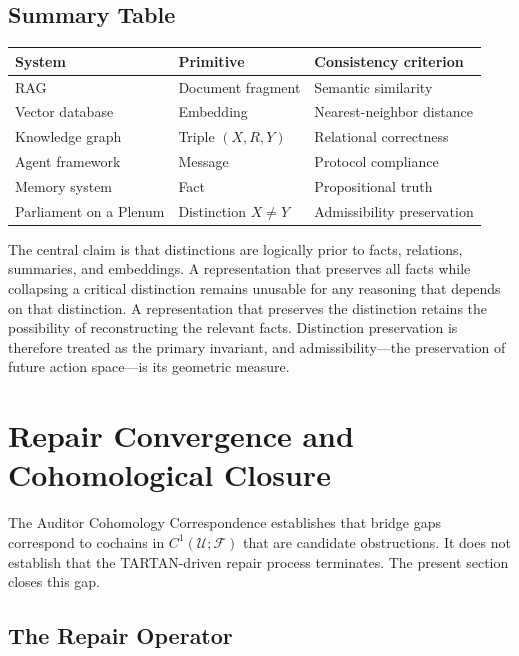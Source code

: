 \documentclass[12pt, a4paper]{article}
\theoremstyle{plain}
\theoremstyle{definition}
\theoremstyle{remark}
\begin{document}
\subsection{Summary Table}

\begin{center}
\renewcommand{\arraystretch}{1.35}
\begin{tabular}{p{3.5cm} p{3.0cm} p{4.5cm}}
\toprule
\textbf{System} & \textbf{Primitive} & \textbf{Consistency criterion} \\
\midrule
RAG & Document fragment & Semantic similarity \\
Vector database & Embedding & Nearest-neighbor distance \\
Knowledge graph & Triple $(X,R,Y)$ & Relational correctness \\
Agent framework & Message & Protocol compliance \\
Memory system & Fact & Propositional truth \\
Parliament on a Plenum & Distinction $X \neq Y$ & Admissibility preservation \\
\bottomrule
\end{tabular}
\end{center}

The central claim is that distinctions are logically prior to facts, relations, summaries, and embeddings. A representation that preserves all facts while collapsing a critical distinction remains unusable for any reasoning that depends on that distinction. A representation that preserves the distinction retains the possibility of reconstructing the relevant facts. Distinction preservation is therefore treated as the primary invariant, and admissibility---the preservation of future action space---is its geometric measure.

\section{Repair Convergence and Cohomological Closure}
\label{sec:repair}

The Auditor Cohomology Correspondence establishes that bridge gaps correspond to cochains in $C^1(\mathcal{U}; \mathcal{F})$ that are candidate obstructions. It does not establish that the TARTAN-driven repair process terminates. The present section closes this gap.

\subsection{The Repair Operator}
\end{document}
